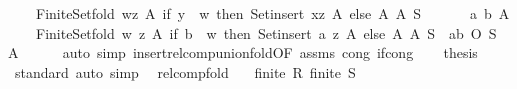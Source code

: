 \begin{isabellebody}
\ \ \ \ Finite{\isacharunderscore}{\kern0pt}Set{\isachardot}{\kern0pt}fold\ {\isacharparenleft}{\kern0pt}{\isasymlambda}{\isacharparenleft}{\kern0pt}w{\isacharcomma}{\kern0pt}z{\isacharparenright}{\kern0pt}\ A{\isacharprime}{\kern0pt}{\isachardot}{\kern0pt}\ if\ y\ {\isacharequal}{\kern0pt}\ w\ then\ Set{\isachardot}{\kern0pt}insert\ {\isacharparenleft}{\kern0pt}x{\isacharcomma}{\kern0pt}z{\isacharparenright}{\kern0pt}\ A{\isacharprime}{\kern0pt}\ else\ A{\isacharprime}{\kern0pt}{\isacharparenright}{\kern0pt}\ A\ S{\isacharparenright}{\kern0pt}{\isachardoublequoteclose}\isanewline
%
\isadelimproof
%
\endisadelimproof
%
\isatagproof
{}\isamarkupfalse%
\ {\isacharminus}{\kern0pt}\isanewline
\ \ \isamarkupfalse%
\ {\isacharasterisk}{\kern0pt}{\isacharcolon}{\kern0pt}\ {\isachardoublequoteopen}{\isasymAnd}a\ b\ A{\isachardot}{\kern0pt}\isanewline
\ \ \ \ Finite{\isacharunderscore}{\kern0pt}Set{\isachardot}{\kern0pt}fold\ {\isacharparenleft}{\kern0pt}{\isasymlambda}{\isacharparenleft}{\kern0pt}w{\isacharcomma}{\kern0pt}\ z{\isacharparenright}{\kern0pt}\ A{\isacharprime}{\kern0pt}{\isachardot}{\kern0pt}\ if\ b\ {\isacharequal}{\kern0pt}\ w\ then\ Set{\isachardot}{\kern0pt}insert\ {\isacharparenleft}{\kern0pt}a{\isacharcomma}{\kern0pt}\ z{\isacharparenright}{\kern0pt}\ A{\isacharprime}{\kern0pt}\ else\ A{\isacharprime}{\kern0pt}{\isacharparenright}{\kern0pt}\ A\ S\ {\isacharequal}{\kern0pt}\ {\isacharbraceleft}{\kern0pt}{\isacharparenleft}{\kern0pt}a{\isacharcomma}{\kern0pt}b{\isacharparenright}{\kern0pt}{\isacharbraceright}{\kern0pt}\ O\ S\ {\isasymunion}\ A{\isachardoublequoteclose}\isanewline
\ \ \ \ \isamarkupfalse%
\ {\isacharparenleft}{\kern0pt}auto\ simp{\isacharcolon}{\kern0pt}\ insert{\isacharunderscore}{\kern0pt}relcomp{\isacharunderscore}{\kern0pt}union{\isacharunderscore}{\kern0pt}fold{\isacharbrackleft}{\kern0pt}OF\ assms{\isacharbrackright}{\kern0pt}\ cong{\isacharcolon}{\kern0pt}\ if{\isacharunderscore}{\kern0pt}cong{\isacharparenright}{\kern0pt}\isanewline
\ \ \isamarkupfalse%
\ {\isacharquery}{\kern0pt}thesis\isanewline
\ \ \ \ \isamarkupfalse%
\ standard\ {\isacharparenleft}{\kern0pt}auto\ simp{\isacharcolon}{\kern0pt}\ {\isacharasterisk}{\kern0pt}{\isacharparenright}{\kern0pt}\isanewline
{}\isamarkupfalse%
%
\endisatagproof
{\isafoldproof}%
%
\isadelimproof
\isanewline
%
\endisadelimproof
\isanewline
{}\isamarkupfalse%
\ relcomp{\isacharunderscore}{\kern0pt}fold{\isacharcolon}{\kern0pt}\isanewline
\ \ \ {\isachardoublequoteopen}finite\ R{\isachardoublequoteclose}\ {\isachardoublequoteopen}finite\ S{\isachardoublequoteclose}\isanewline

\end{isabellebody}
